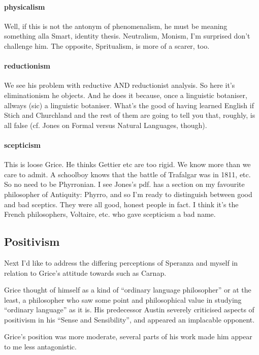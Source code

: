 \documentclass[10pt,titlepage]{book}
\begin{document}
\paragraph{physicalism}
Well, if this is not the antonym of phenomenalism, he must be  
meaning something alla Smart, identity thesis. Neutralism, Monism, I'm 
surprised  don't challenge him. The opposite, Spritualism, is more of a scarer, 
too.
 
\paragraph{reductionism}
We see his problem with reductive AND reductionist analysis.  
So here it's eliminationism he objects. And he does it because, once a  
linguistic botaniser, allways (sic) a linguistic botaniser. What's the good of  
having learned English if Stich and Churchland and the rest of them are 
going to  tell you that, roughly, is all false (cf. Jones on Formal versus 
Natural  Languages, though).
 
\paragraph{scepticism}
This is loose Grice. He thinks Gettier etc are too rigid. We  
know more than we care to admit. A schoolboy knows that the battle of 
Trafalgar  was in 1811, etc. So no need to be Phyrronian. I see Jones's pdf. has a 
section  on my favourite philosopher of Antiquity: Phyrro, and so I'm ready 
to  distinguish between good and bad sceptics. They were all good, honest 
people in  fact. I think it's the French philosophers, Voltaire, etc. who gave 
scepticism a  bad name.

\subsection{Positivism}

Next I'd like to address the differing perceptions of Speranza and myself in relation to Grice's attitude towards such as Carnap.

Grice thought of himself as a kind of ``ordinary language philosopher'' or at the least, a philosopher who saw some point and philosophical value in studying ``ordinary language'' as it is.
His predecessor Austin severely criticised aspects of positivism in his ``Sense and Sensibility'', and appeared an implacable opponent.

Grice's position was more moderate, several parts of his work made him appear to me less antagonistic.
\end{document}
